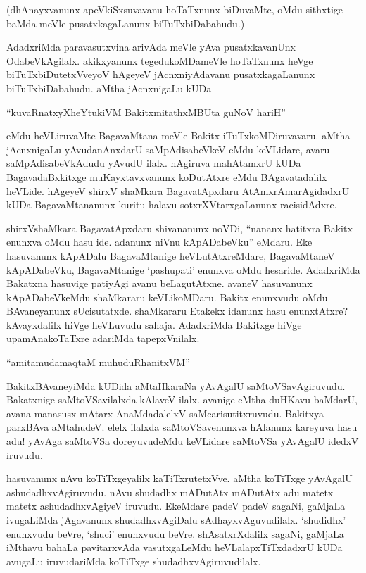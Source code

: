 (dhAnayxvanunx apeVkiSxsuvavanu hoTaTxnunx biDuvaMte, oMdu sithxtige baMda meVle pusatxkagaLanunx biTuTxbiDabahudu.)

AdadxriMda paravasutxvina arivAda meVle yAva pusatxkavanUnx OdabeVkAgilalx. akikxyanunx tegedukoMDameVle hoTaTxnunx heVge biTuTxbiDutetxVveyoV hAgeyeV jAcnxniyAdavanu pusatxkagaLanunx biTuTxbiDabahudu. aMtha jAcnxnigaLu kUDa

\begin{shloka}
``kuvaRnatxyXheYtukiVM BakitxmitathxMBUta guNoV hariH''
\end{shloka}

eMdu heVLiruvaMte BagavaMtana meVle Bakitx iTuTxkoMDiruvavaru. aMtha jAcnxnigaLu yAvudanAnxdarU saMpAdisabeVkeV eMdu keVLidare, avaru saMpAdisabeVkAdudu yAvudU ilalx. hAgiruva mahAtamxrU kUDa BagavadaBxkitxge muKayxtavxvanunx koDutAtxre eMdu BAgavatadalilx heVLide. hAgeyeV shirxV shaMkara BagavatApxdaru AtAmxrAmarAgidadxrU kUDa BagavaMtananunx kuritu halavu sotxrXVtarxgaLanunx racisidAdxre.

shirxVshaMkara BagavatApxdaru shivananunx noVDi, ``nananx hatitxra Bakitx enunxva oMdu hasu ide. adanunx niVnu kApADabeVku'' eMdaru. Eke hasuvanunx kApADalu BagavaMtanige heVLutAtxreMdare, BagavaMtaneV kApADabeVku, BagavaMtanige `pashupati' enunxva oMdu hesaride. AdadxriMda Bakatxna hasuvige patiyAgi avanu beLagutAtxne. avaneV hasuvanunx kApADabeVkeMdu shaMkararu keVLikoMDaru. Bakitx enunxvudu oMdu BAvaneyanunx sUcisutatxde. shaMkararu Etakekx idanunx hasu enunxtAtxre? kAvayxdalilx hiVge heVLuvudu sahaja. AdadxriMda Bakitxge hiVge upamAnakoTaTxre adariMda tapepxVnilalx.

\begin{shloka}
``amitamudamaqtaM muhuduRhanitxVM''
\end{shloka}

BakitxBAvaneyiMda kUDida aMtaHkaraNa yAvAgalU saMtoVSavAgiruvudu. Bakatxnige saMtoVSavilalxda kAlaveV ilalx. avanige eMtha duHKavu baMdarU, avana manasusx mAtarx AnaMdadalelxV saMcarisutitxruvudu. Bakitxya parxBAva aMtahudeV. elelx ilalxda saMtoVSavenunxva hAlanunx kareyuva hasu adu! yAvAga saMtoVSa doreyuvudeMdu keVLidare saMtoVSa yAvAgalU idedxV iruvudu.

hasuvanunx nAvu koTiTxgeyalilx kaTiTxrutetxVve. aMtha koTiTxge yAvAgalU ashudadhxvAgiruvudu. nAvu shudadhx mADutAtx mADutAtx adu matetx matetx ashudadhxvAgiyeV iruvudu. EkeMdare padeV padeV sagaNi, gaMjaLa ivugaLiMda jAgavanunx shudadhxvAgiDalu sAdhayxvAguvudilalx. `shudidhx' enunxvudu beVre, `shuci' enunxvudu beVre. shAsatxrXdalilx sagaNi, gaMjaLa iMthavu bahaLa pavitarxvAda vasutxgaLeMdu heVLalapxTiTxdadxrU kUDa avugaLu iruvudariMda koTiTxge shudadhxvAgiruvudilalx.


